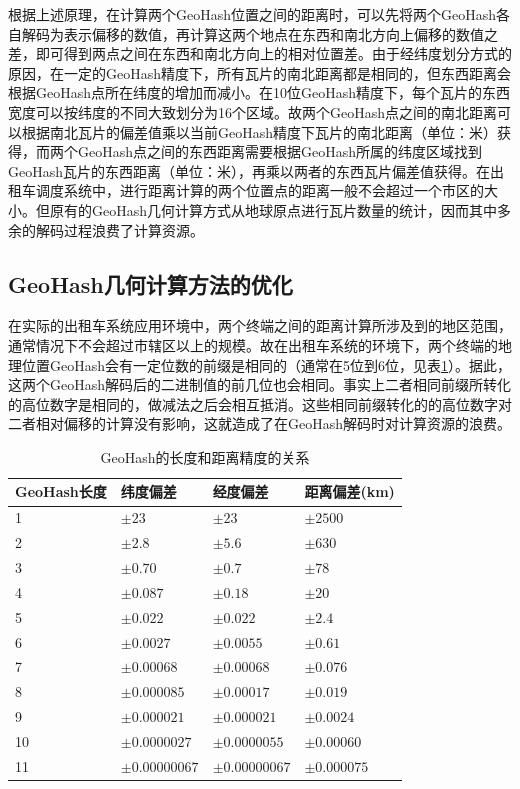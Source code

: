根据上述原理，在计算两个GeoHash位置之间的距离时，可以先将两个GeoHash各自解码为表示偏移的数值，再计算这两个地点在东西和南北方向上偏移的数值之差，即可得到两点之间在东西和南北方向上的相对位置差。由于经纬度划分方式的原因，在一定的GeoHash精度下，所有瓦片的南北距离都是相同的，但东西距离会根据GeoHash点所在纬度的增加而减小。在10位GeoHash精度下，每个瓦片的东西宽度可以按纬度的不同大致划分为16个区域。故两个GeoHash点之间的南北距离可以根据南北瓦片的偏差值乘以当前GeoHash精度下瓦片的南北距离（单位：米）获得，而两个GeoHash点之间的东西距离需要根据GeoHash所属的纬度区域找到GeoHash瓦片的东西距离（单位：米），再乘以两者的东西瓦片偏差值获得。在出租车调度系统中，进行距离计算的两个位置点的距离一般不会超过一个市区的大小。但原有的GeoHash几何计算方式从地球原点进行瓦片数量的统计，因而其中多余的解码过程浪费了计算资源。

\subsection{GeoHash几何计算方法的优化}
在实际的出租车系统应用环境中，两个终端之间的距离计算所涉及到的地区范围，通常情况下不会超过市辖区以上的规模。故在出租车系统的环境下，两个终端的地理位置GeoHash会有一定位数的前缀是相同的（通常在5位到6位，见表\ref{tab:GeoHashScale}）。据此，这两个GeoHash解码后的二进制值的前几位也会相同。事实上二者相同前缀所转化的高位数字是相同的，做减法之后会相互抵消。这些相同前缀转化的的高位数字对二者相对偏移的计算没有影响，这就造成了在GeoHash解码时对计算资源的浪费。

\begin{table}
  \centering
  \caption{GeoHash的长度和距离精度的关系}\label{tab:GeoHashScale}
  \begin{tabular*}{0.9\textwidth}{@{\extracolsep{\fill}}llll}
  \toprule
    GeoHash长度    &纬度偏差 &经度偏差 &距离偏差(km) \\
  \midrule
    1    &$\pm23$ &$\pm23$ &$\pm2500$\\
    2    &$\pm2.8$ &$\pm5.6$ &$\pm630$\\
    3    &$\pm0.70$ &$\pm0.7$ &$\pm78$\\
    4    &$\pm0.087$ &$\pm0.18$ &$\pm20$\\
    5    &$\pm0.022$ &$\pm0.022$ &$\pm2.4$\\
    6    &$\pm0.0027$ &$\pm0.0055$ &$\pm0.61$\\
    7    &$\pm0.00068$ &$\pm0.00068$ &$\pm0.076$\\
    8    &$\pm0.000085$ &$\pm0.00017$ &$\pm0.019$\\
    9    &$\pm0.000021$ &$\pm0.000021$ &$\pm0.0024$\\
    10    &$\pm0.0000027$ &$\pm0.0000055$ &$\pm0.00060$\\
    11    &$\pm0.00000067$ &$\pm0.00000067$ &$\pm0.000075$\\
  \bottomrule
  \end{tabular*}
\end{table}

